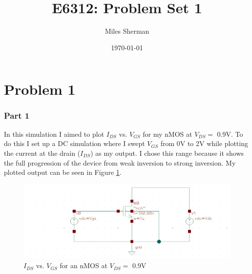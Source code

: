 \documentclass{article}
\begin{document}
\title{E6312: Problem Set 1}
\author{Miles Sherman}
\date{\today}
\maketitle

\section{Problem 1}
\subsubsection{Part 1}
In this simulation I aimed to plot $I_{DS}$ vs. $V_{GS}$ for my nMOS at $V_{DS} =$ 0.9V. To do this I set up a DC simulation where I swept $V_{GS}$ from 0V to 2V while plotting the current at the drain ($I_{DS}$) as my output. I chose this range because it shows the full progression of the device from weak inversion to strong inversion. My plotted output can be seen in Figure \ref{1anmos}.
\begin{figure}[\h]
\centering
\includegraphics[width=7in]{1abc_schematic.png}
\caption{$I_{DS}$ vs. $V_{GS}$ for an nMOS at $V_{DS} =$ 0.9V}
\label{1anmos}
\end{figure}
\newpage
\end{document}
